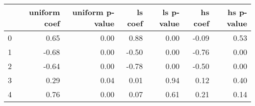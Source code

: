 \begin{tabular}{lrrrrrr}
\toprule
 & uniform coef & uniform p-value & ls coef & ls p-value & hs coef & hs p-value \\
\midrule
0 & 0.65 & 0.00 & 0.88 & 0.00 & -0.09 & 0.53 \\
1 & -0.68 & 0.00 & -0.50 & 0.00 & -0.76 & 0.00 \\
2 & -0.64 & 0.00 & -0.78 & 0.00 & -0.50 & 0.00 \\
3 & 0.29 & 0.04 & 0.01 & 0.94 & 0.12 & 0.40 \\
4 & 0.76 & 0.00 & 0.07 & 0.61 & 0.21 & 0.14 \\
\bottomrule
\end{tabular}
